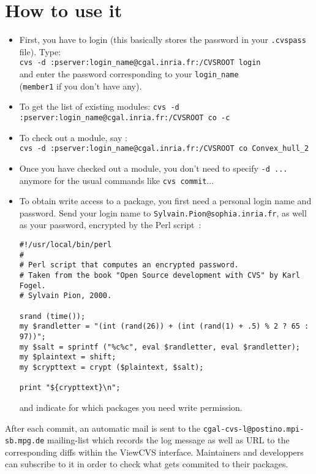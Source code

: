 \section{How to use it}
\label{sec:cvs_how_to}

\begin{itemize}
\item
    First, you have to login (this basically stores the password in your
    \texttt{.cvspass} file). Type: \\
    \texttt{cvs -d :pserver:login\_name@cgal.inria.fr:/CVSROOT login} \\
    and enter the password corresponding to your \texttt{login\_name} \\
    (\texttt{member1} if you don't have any).
\item
    To get the list of existing modules:
    \texttt{cvs -d :pserver:login\_name@cgal.inria.fr:/CVSROOT co -c}
\item
    To check out a module, say : \\
    \texttt{cvs -d :pserver:login\_name@cgal.inria.fr:/CVSROOT co
    Convex\_hull\_2}
\item
    Once you have checked out a module, you don't need to specify
    \texttt{-d ...} anymore for the usual commands like \texttt{cvs commit}...
\item
    To obtain write access to a package, you first need a personal login
    name and password.  Send your login name to 
    {\texttt{Sylvain.Pion@sophia.inria.fr}}, as well as your password,
    encrypted by the Perl script~:
\begin{verbatim}
#!/usr/local/bin/perl
#
# Perl script that computes an encrypted password.
# Taken from the book "Open Source development with CVS" by Karl Fogel.
# Sylvain Pion, 2000.

srand (time());
my $randletter = "(int (rand(26)) + (int (rand(1) + .5) % 2 ? 65 : 97))";
my $salt = sprintf ("%c%c", eval $randletter, eval $randletter);
my $plaintext = shift;
my $crypttext = crypt ($plaintext, $salt);

print "${crypttext}\n";
\end{verbatim}

    and indicate for which packages you need write permission.
\end{itemize}

After each commit, an automatic mail is sent to the
\texttt{cgal-cvs-l@postino.mpi-sb.mpg.de} mailing-list which records
the log message as well as URL to the corresponding diffs within
the ViewCVS interface.  Maintainers and developpers can subscribe
to it in order to check what gets commited to their packages.

